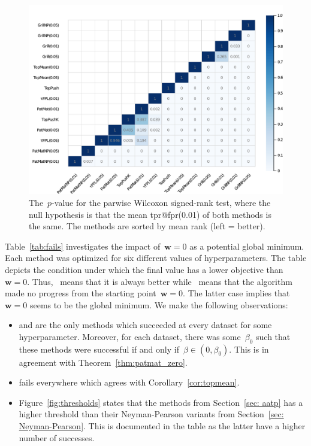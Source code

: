 \begin{figure}[!ht]
  \centering
  \includegraphics[width = \linewidth]{images/wilcoxon_fpr_1.pdf}
  \caption{The~$p$-value for the parwise Wilcoxon signed-rank test, where the null hypothesis is that the mean tpr@fpr(0.01) of both methods is the same. The methods are sorted by mean rank (left = better).}
  \label{fig:wilcoxon}
\end{figure}

Table~\ref{tab:fails} investigates the impact of~$\bm{w}=0$ as a potential global minimum. Each method was optimized for six different values of hyperparameters. The table depicts the condition under which the final value has a lower objective than~$\bm{w}=0$. Thus, \yesmark\ means that it is always better while \nomark\ means that the algorithm made no progress from the starting point~$\bm{w} =0$. The latter case implies that~$\bm{w}=0$ seems to be the global minimum. We make the following observations:
\begin{itemize}
  \item \PatMat and \PatMatNP are the only methods which succeeded at every dataset for some hyperparameter. Moreover, for each dataset, there was some~$\beta_0$ such that these methods were successful if and only if~$\beta\in(0,\beta_0)$. This is in agreement with Theorem~\ref{thm:patmat_zero}.
  \item \TopMeanK fails everywhere which agrees with Corollary~\ref{cor:topmean}.
  \item Figure~\ref{fig:thresholds} states that the methods from Section~\ref{sec: aatp} has a higher threshold than their Neyman-Pearson variants from Section~\ref{sec: Neyman-Pearson}. This is documented in the table as the latter have a higher number of successes.
\end{itemize}


